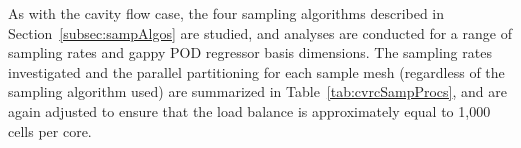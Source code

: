 As with the cavity flow case, the four sampling algorithms described in Section~\ref{subsec:sampAlgos} are studied, and analyses are conducted for a range of sampling rates and gappy POD regressor basis dimensions. The sampling rates investigated and the parallel partitioning for each sample mesh (regardless of the sampling algorithm used) are summarized in Table~\ref{tab:cvrcSampProcs}, and are again adjusted to ensure that the load balance is approximately equal to 1,000 cells per core.

\begin{figure}
	\begin{minipage}{0.99\linewidth}
	\end{minipage}
	\begin{minipage}{0.99\linewidth}
	\end{minipage}
	\begin{minipage}{0.99\linewidth}

\end{minipage}
\end{figure}
